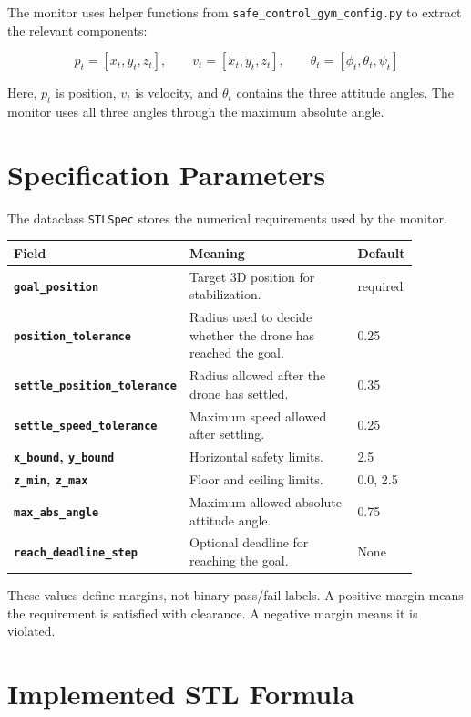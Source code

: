 \documentclass[11pt]{article}
\newcommand{\code}[1]{\texttt{#1}}
\newcommand{\metric}[1]{{\footnotesize\texttt{#1}}}
\begin{document}
The monitor uses helper functions from \code{safe\_control\_gym\_config.py} to extract the relevant components:

\[
p_t = [x_t, y_t, z_t], \qquad
v_t = [\dot{x}_t, \dot{y}_t, \dot{z}_t], \qquad
\theta_t = [\phi_t, \theta_t, \psi_t]
\]

Here, \(p_t\) is position, \(v_t\) is velocity, and \(\theta_t\) contains the three attitude angles. The monitor uses all three angles through the maximum absolute angle.

\section{Specification Parameters}

The dataclass \code{STLSpec} stores the numerical requirements used by the monitor.

\begin{center}
\begin{tabular}{>{\bfseries}p{0.36\linewidth}p{0.43\linewidth}p{0.09\linewidth}}
\toprule
Field & Meaning & Default \\
\midrule
\metric{goal\_position} & Target 3D position for stabilization. & required \\
\metric{position\_tolerance} & Radius used to decide whether the drone has reached the goal. & 0.25 \\
\metric{settle\_position\_tolerance} & Radius allowed after the drone has settled. & 0.35 \\
\metric{settle\_speed\_tolerance} & Maximum speed allowed after settling. & 0.25 \\
\metric{x\_bound}, \metric{y\_bound} & Horizontal safety limits. & 2.5 \\
\metric{z\_min}, \metric{z\_max} & Floor and ceiling limits. & 0.0, 2.5 \\
\metric{max\_abs\_angle} & Maximum allowed absolute attitude angle. & 0.75 \\
\metric{reach\_deadline\_step} & Optional deadline for reaching the goal. & None \\
\bottomrule
\end{tabular}
\end{center}

These values define margins, not binary pass/fail labels. A positive margin means the requirement is satisfied with clearance. A negative margin means it is violated.

\section{Implemented STL Formula}
\end{document}
